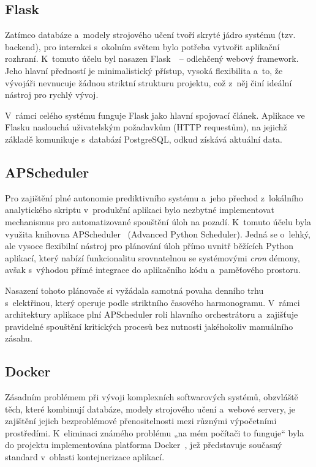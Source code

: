 \documentclass[a4paper]{article}
\begin{document}
\newpage
\subsection{Flask}
Zatímco databáze a~modely strojového učení tvoří skryté jádro systému (tzv. backend), pro interakci s~okolním světem bylo potřeba vytvořit aplikační rozhraní. K~tomuto účelu byl nasazen Flask~\cite{flask}~-- odlehčený webový framework. Jeho hlavní předností je minimalistický přístup, vysoká flexibilita a~to, že vývojáři nevnucuje žádnou striktní strukturu projektu, což z~něj činí ideální nástroj pro rychlý vývoj. 

V~rámci celého systému funguje Flask jako hlavní spojovací článek. Aplikace ve Flasku naslouchá uživatelským požadavkům (HTTP requestům), na jejichž základě komunikuje s~databází PostgreSQL, odkud získává aktuální data. 

\subsection{APScheduler}
Pro zajištění plné autonomie prediktivního systému a~jeho přechod z~lokálního analytického skriptu v~produkční aplikaci bylo nezbytné implementovat mechanismus pro automatizované spouštění úloh na pozadí. K~tomuto účelu byla využita knihovna APScheduler~\cite{apscheduler} (Advanced Python Scheduler). Jedná se o~lehký, ale vysoce flexibilní nástroj pro plánování úloh přímo uvnitř běžících Python aplikací, který nabízí funkcionalitu srovnatelnou se systémovými \textit{cron} démony, avšak s~výhodou přímé integrace do aplikačního kódu a~paměťového prostoru.

Nasazení tohoto plánovače si vyžádala samotná povaha denního trhu s~elektřinou, který operuje podle striktního časového harmonogramu. V~rámci architektury aplikace plní APScheduler roli hlavního orchestrátoru a~zajišťuje pravidelné spouštění kritických procesů bez nutnosti jakéhokoliv manuálního zásahu.

\subsection{Docker}
Zásadním problémem při vývoji komplexních softwarových systémů, obzvláště těch, které kombinují databáze, modely strojového učení a~webové servery, je zajištění jejich bezproblémové přenositelnosti mezi různými výpočetními prostředími. K~eliminaci známého problému „na mém počítači to funguje“ byla do projektu implementována platforma Docker~\cite{docker}, jež představuje současný standard v~oblasti kontejnerizace aplikací.
\end{document}
